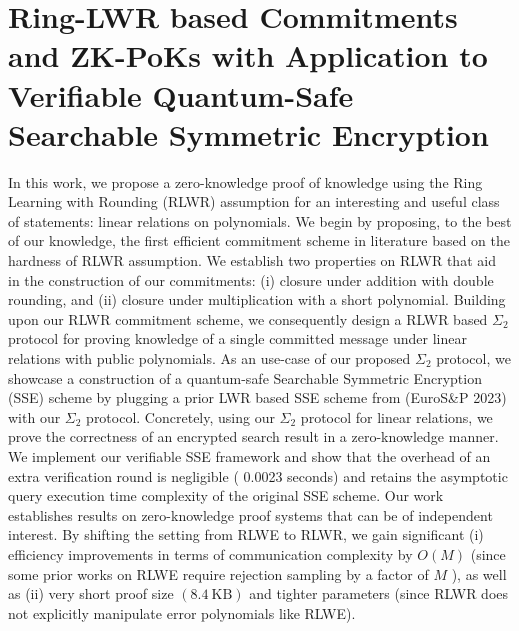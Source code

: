 \documentclass[11pt]{article}
\theoremstyle{definition}
\theoremstyle{remark}
\theoremstyle{plain}
\begin{document}
\section{\cite{cryptoeprint:2025/1216} Ring-{LWR} based Commitments and {ZK}-{PoKs} with Application to Verifiable Quantum-Safe Searchable Symmetric Encryption}
In this work, we propose a zero-knowledge proof of knowledge using the Ring Learning with Rounding (RLWR) assumption for an interesting and useful class of statements: linear relations on polynomials. We begin by proposing, to the best of our knowledge, the first efficient commitment scheme in literature based on the hardness of RLWR assumption. We establish two properties on RLWR that aid in the construction of our commitments: (i) closure under addition with double rounding, and (ii) closure under multiplication with a short polynomial. Building upon our RLWR commitment scheme, we consequently design a RLWR based $\Sigma_2$ protocol for proving knowledge of a single committed message under linear relations with public polynomials.
As an use-case of our proposed $\Sigma_2$ protocol, we showcase a construction of a quantum-safe Searchable Symmetric Encryption (SSE) scheme by plugging a prior LWR based SSE scheme from (EuroS\&P 2023) with our $\Sigma_2$ protocol. Concretely, using our $\Sigma_2$ protocol for linear relations, we prove the correctness of an encrypted search result in a zero-knowledge manner. We implement our verifiable SSE framework and show that the overhead of an extra verification round is negligible ( 0.0023 seconds) and retains the asymptotic query execution time complexity of the original SSE scheme.
Our work establishes results on zero-knowledge proof systems that can be of independent interest. By shifting the setting from RLWE to RLWR, we gain significant (i) efficiency improvements in terms of communication complexity by $O(M)$ (since some prior works on RLWE require rejection sampling by a factor of $M$ ), as well as (ii) very short proof size $(8.4 \mathrm{~KB})$ and tighter parameters (since RLWR does not explicitly manipulate error polynomials like RLWE).
\end{document}
